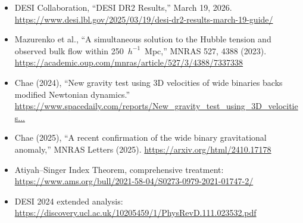 \documentclass[11pt]{article}
\theoremstyle{definition}
\theoremstyle{remark}
\begin{document}
\begin{itemize}

\item DESI Collaboration, ``DESI DR2 Results,'' March 19, 2026.
  \url{https://www.desi.lbl.gov/2025/03/19/desi-dr2-results-march-19-guide/}

\item Mazurenko et al., ``A simultaneous solution to the Hubble tension
  and observed bulk flow within 250~$h^{-1}$~Mpc,'' MNRAS 527, 4388 (2023).
  \url{https://academic.oup.com/mnras/article/527/3/4388/7337338}

\item Chae (2024), ``New gravity test using 3D velocities of wide binaries
  backs modified Newtonian dynamics.''
  \url{https://www.spacedaily.com/reports/New_gravity_test_using_3D_velocities...}

\item Chae (2025), ``A recent confirmation of the wide binary gravitational
  anomaly,'' MNRAS Letters (2025).
  \url{https://arxiv.org/html/2410.17178}

\item Atiyah--Singer Index Theorem, comprehensive treatment:
  \url{https://www.ams.org/bull/2021-58-04/S0273-0979-2021-01747-2/}

\item DESI 2024 extended analysis:
  \url{https://discovery.ucl.ac.uk/10205459/1/PhysRevD.111.023532.pdf}

\end{itemize}
\end{document}

